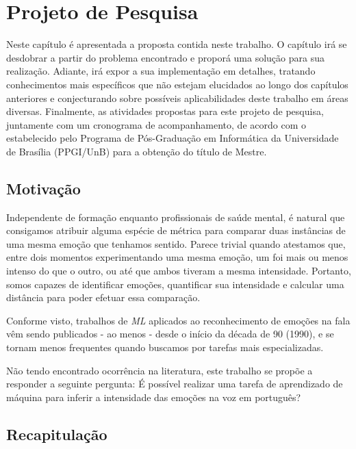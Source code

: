 \chapter{Projeto de Pesquisa}\label{Cap:Projeto de Pesquisa}

Neste capítulo é apresentada a proposta contida neste trabalho. O capítulo irá se desdobrar a partir do problema encontrado e proporá uma solução para sua realização. Adiante, irá expor a sua implementação em detalhes, tratando conhecimentos mais específicos que não estejam elucidados ao longo dos capítulos anteriores e conjecturando sobre possíveis aplicabilidades deste trabalho em áreas diversas. Finalmente, as atividades propostas para este projeto de pesquisa, juntamente com um cronograma de acompanhamento, de acordo com o estabelecido pelo Programa de Pós-Graduação em Informática da Universidade de Brasília (PPGI/UnB) para a obtenção do título de Mestre.\\

\section{Motivação}

Independente de formação enquanto profissionais de saúde mental, é natural que consigamos atribuir alguma espécie de métrica para comparar duas instâncias de uma mesma emoção que tenhamos sentido. Parece trivial quando atestamos que, entre dois momentos experimentando uma mesma emoção, um foi mais ou menos intenso do que o outro, ou até que ambos tiveram a mesma intensidade. Portanto, somos capazes de identificar emoções, quantificar sua intensidade e calcular uma distância para poder efetuar essa comparação.

Conforme visto, trabalhos de \textit{ML} aplicados ao reconhecimento de emoções na fala vêm sendo publicados - ao menos - desde o início da década de 90 (1990), e se tornam menos frequentes quando buscamos por tarefas mais especializadas.

Não tendo encontrado ocorrência na literatura, este trabalho se propõe a responder a seguinte pergunta: É possível realizar uma tarefa de aprendizado de máquina para inferir a intensidade das emoções na voz em português?

\section{Recapitulação}

